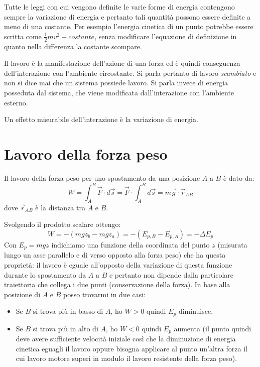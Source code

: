 \documentclass[class=book, crop=false, oneside, 12pt]{standalone}
\begin{document}
Tutte le leggi con cui vengono definite le varie forme di energia contengono sempre la variazione di energia e pertanto tali quantità possono essere definite a meno di una costante.
Per esempio l'energia cinetica di un punto potrebbe essere scritta come \(\frac{1}{2} m v^2 + costante\), senza modificare l'equazione di definizione in quanto nella differenza la costante scompare.

Il lavoro è la manifestazione dell'azione di una forza ed è quindi conseguenza dell'interazione con l'ambiente circostante.
Si parla pertanto di lavoro \emph{scambiato} e non si dice mai che un sistema possiede lavoro.
Si parla invece di energia posseduta dal sistema, che viene modificata dall'interazione con l'ambiente esterno.

Un effetto misurabile dell'interazione è la variazione di energia.

\section{Lavoro della forza peso}

Il lavoro della forza peso per uno spostamento da una posizione \(A\) a \(B\) è dato da:
\begin{equation}
    W = \int_A^B \overrightarrow{F} \cdot d \overrightarrow{s} = \overrightarrow{F} \cdot \int_A^B d \overrightarrow{s} = m \overrightarrow{g} \cdot \overrightarrow{r}_{AB}
\end{equation}
dove \(\overrightarrow{r}_{AB}\) è la distanza tra \(A\) e \(B\).

Svolgendo il prodotto scalare ottengo:
\begin{equation}
    W = - (mgz_b - mgz_a) =- (E_{p,B} - E_{p,A}) = - \Delta E_p
\end{equation}
Con \(E_p= m g z\) indichiamo una funzione della coordinata del punto \(z\) (misurata lungo un asse parallelo e di verso opposto alla forza peso) che ha questa proprietà: il lavoro è eguale all'opposto della variazione di questa funzione durante lo spostamento da \(A\) a \(B\) e pertanto non dipende dalla particolare traiettoria che collega i due punti (conservazione della forza).\newline
In base alla posizione di \(A\) e \(B\) posso trovarmi in due casi:
\begin{itemize}
    \item Se \(B\) si trova più in basso di \(A\), ho \(W>0\) quindi \(E_p\) diminuisce.
    \item Se \(B\) si trova più in alto di \(A\), ho \(W<0\) quindi \(E_p\) aumenta
    (il punto quindi deve avere sufficiente velocità iniziale così che la diminuzione di energia cinetica eguagli il lavoro oppure bisogna applicare al punto un'altra forza il cui lavoro motore superi in modulo il lavoro resistente della forza peso).
\end{itemize}
\end{document}
